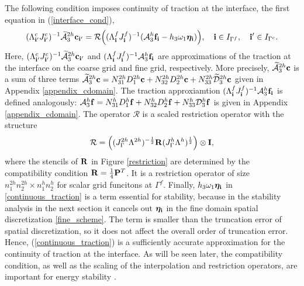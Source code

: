 The following condition imposes continuity of traction at the interface, the first equation in (\ref{interface_cond}),
\begin{equation}\label{continuous_traction}
(\Lambda^{c}_{{\bf i}'}J_{{\bf i}'}^{c})^{-1}\wt{\mathcal{A}}_3^{2h}{\bf c}_{{\bf i}'}
= {\mathcal{R}}\Big((\Lambda^f_{\bf i}{ J}^f_{\bf i})^{-1}(\mathcal{A}_3^h{\bf f}_{\bf i}-h_3\omega_1{\bm \eta}_{\bf i})\Big), \quad {\bf i}\in I_{\Gamma^f},\quad {{\bf i}'}\in I_{\Gamma^c}.
\end{equation}
Here,  $(\Lambda^{c}_{{\bf i}'}J_{{\bf i}'}^{c})^{-1}\widetilde{\mathcal{A}}_3^{2h}{\bf c}_{{\bf i}'}$ and $(\Lambda^f_{\bf i}{ J}^f_{\bf i})^{-1}\mathcal{A}_3^h{\bf f}_{\bf i}$ are approximations of the traction at the interface on the coarse grid and fine grid, respectively. More precisely, $\widetilde{\mathcal{A}}_3^{2h}{\bf c}$ is a sum of three terms  $\widetilde{\mathcal{A}}_3^{2h}{\bf c}= {N}_{31}^{2h}{D}^{2h}_1{\bf c} + {N}_{32}^{2h}{D}^{2h}_2{\bf c} + {N}_{33}^{2h}\widetilde{\mathcal{D}}^{2h}_3{\bf c}$ given in Appendix \ref{appendix_cdomain}. The traction approxiamtion $(\Lambda^f_{\bf i}{ J}^f_{\bf i})^{-1}\mathcal{A}_3^h{\bf f}_{\bf i}$ is defined analogously: ${\mathcal{A}}_3^{h}{\bf f}= {N}_{31}^{h}{D}^{h}_1{\bf f} + {N}_{32}^{h}{D}^{h}_2{\bf f} + {N}_{33}^{h}{\mathcal{D}}^{h}_3{\bf f}$ is given in Appendix \ref{appendix_cdomain}.   The operator $\mathcal{R}$ is a scaled restriction operator with the structure 
\begin{equation}\label{scaleR}
 {\mathcal{R}} =  \left(({J}^{2h}_\Gamma{\Lambda}^{2h})^{-\frac{1}{2}}{\bf R}({J}^{h}_\Gamma {\Lambda}^h)^{\frac{1}{2}}\right)\otimes {\bf I},
 \end{equation}
 where the stencils of ${\bf R}$  in Figure \ref{restriction} are determined by the compatibility condition ${\bf R}=\frac{1}{4}{\bf P}^T$. It is a restriction operator of size $n_1^{2h}n_2^{2h}\times n_1^hn_2^h$ for scalar grid funcitons at $\Gamma^f$.   Finally, $h_3\omega_1{\bm \eta}_{\bf i}$ in \eqref{continuous_traction} is a term essential for stability, because in the stability analysis in the next section it cancels out ${\bm \eta}_{\bf i}$ in the fine domain spatial discretization \eqref{fine_scheme}. The term is smaller than the truncation error of spatial discretization, so it does not affect the overall order of truncation error. Hence, (\ref{continuous_traction})  is a sufficiently accurate approximation for the continuity of traction at the interface.  
 As will be seen later, the compatibility condition, as well as the scaling of the interpolation and restriction operators, are important for energy stability \cite{Lundquist2018}. 
